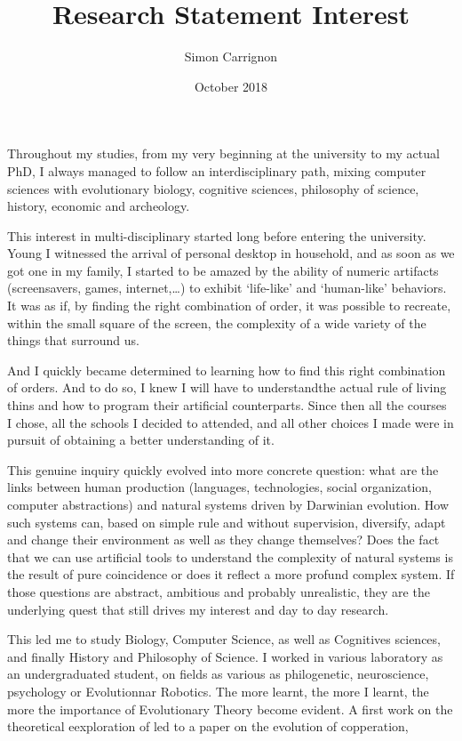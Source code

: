 \documentclass[10pt]{article}
\author{Simon Carrignon}
\title{Research Statement Interest}
\date{October 2018}
\begin{document}
\maketitle


Throughout my studies, from my very beginning at the university to my actual PhD, I always managed to follow an interdisciplinary path, mixing computer sciences with evolutionary biology, cognitive sciences, philosophy of science, history, economic and archeology.

This interest in multi-disciplinary started long before entering the university. Young I witnessed the arrival of personal desktop in household, and as soon as we got one in my family, I started to be amazed by the ability of numeric artifacts (screensavers, games, internet,\ldots) to exhibit ‘life-like’ and ‘human-like’ behaviors. 
It was as if, by finding the right combination of order, it was possible to recreate, within the small square of the screen, the complexity of a wide variety of the things that surround us. 

And I quickly became determined to learning how to find this right combination of orders. And to do so, I knew I will have to understandthe actual rule of living thins and how to program their artificial counterparts. Since then all the courses I chose, all the schools I decided to attended, and all other choices I made were in pursuit of obtaining a better understanding of it.

This genuine inquiry quickly evolved into more concrete question: what are the links between human production (languages, technologies, social organization, computer abstractions) and natural systems driven by Darwinian evolution. How such systems can, based on simple rule and without supervision, diversify, adapt and change their environment as well as they change themselves? 
Does the fact that we can use artificial tools to understand the complexity of natural systems is the result of pure coincidence or does it reflect a more profund complex system.  If those questions are abstract, ambitious and probably unrealistic, they are the underlying quest that still drives my interest and day to day research.

This led me to study Biology, Computer Science, as well as Cognitives sciences, and finally History and Philosophy of Science. I worked in various laboratory as an undergraduated student, on fields as various as philogenetic, neuroscience, psychology or Evolutionnar Robotics. The more  learnt, the more I learnt, the more the importance of Evolutionary Theory become evident. A first work on the theoretical eexploration of led to a paper \cite{zibetti2015acaciaesanagentbasedmodelingandsimulationtoolforinvestigatingsocialbehaviorsinresourcelimitedtwodimensionalenvironments} on the evolution of copperation,
\end{document}
